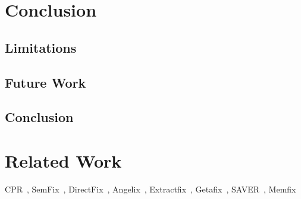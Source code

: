 \documentclass[a4paper,11pt,oneside,openany]{book}
\begin{document}
\chapter{Conclusion}
\label{conclusion}
\section{Limitations}

\section{Future Work}

\section{Conclusion}
\chapter{Related Work}
CPR~\cite{CPR}, SemFix~\cite{semfix}, DirectFix~\cite{directfix}, Angelix~\cite{Angelix}, Extractfix~\cite{Extractfix}, Getafix~\cite{Getafix}, SAVER~\cite{SAVER}, Memfix~\cite{Memfix}



\end{document}
